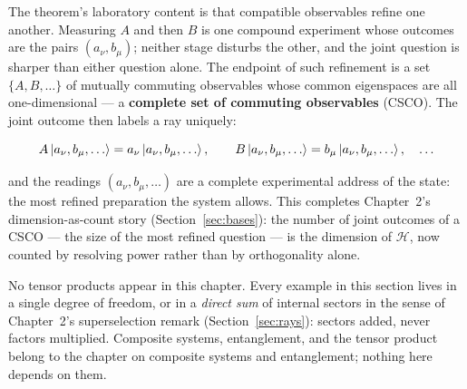 The theorem's laboratory content is that compatible observables refine one another. Measuring $A$ and then $B$ is one compound experiment whose outcomes are the pairs $(a_\nu,b_\mu)$; neither stage disturbs the other, and the joint question is sharper than either question alone. The endpoint of such refinement is a set $\{A,B,\dots\}$ of mutually commuting observables whose common eigenspaces are all one-dimensional --- a \textbf{complete set of commuting observables} (CSCO). The joint outcome then labels a ray uniquely:
\begin{linenomath}
\begin{equation}
    A\ket{a_\nu,b_\mu,\dots}=a_\nu\ket{a_\nu,b_\mu,\dots},
    \qquad
    B\ket{a_\nu,b_\mu,\dots}=b_\mu\ket{a_\nu,b_\mu,\dots},
    \quad\dots
    \label{eq:csco-joint}
\end{equation}
\end{linenomath}
and the readings $(a_\nu,b_\mu,\dots)$ are a complete experimental address of the state: the most refined preparation the system allows. This completes Chapter~2's dimension-as-count story (Section~\ref{sec:bases}): the number of joint outcomes of a CSCO --- the size of the most refined question --- is the dimension of $\mathcal H$, now counted by resolving power rather than by orthogonality alone.

\begin{note}
No tensor products appear in this chapter. Every example in this section lives in a single degree of freedom, or in a \emph{direct sum} of internal sectors in the sense of Chapter~2's superselection remark (Section~\ref{sec:rays}): sectors added, never factors multiplied. Composite systems, entanglement, and the tensor product belong to the chapter on composite systems and entanglement; nothing here depends on them.
\end{note}

